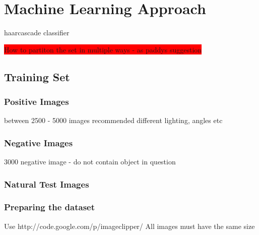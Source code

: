 
\section{Machine Learning Approach}
haarcascade classifier

\colorbox{red}{How to partiton the set in multiple ways - as paddys suggestion}

\subsection{Training Set}

\subsubsection{Positive Images}
between 2500 - 5000 images recommended
different lighting, angles etc

\subsubsection{Negative Images}
3000 negative image - do not contain object in question

\subsubsection{Natural Test Images}

\subsubsection{Preparing the dataset}
Use http://code.google.com/p/imageclipper/ 
All images must have the same size
